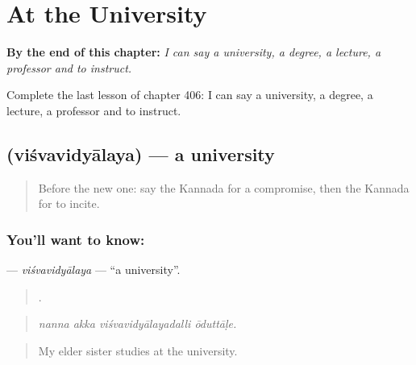 
\chapter{At the University}
\label{ch:ka-at-the-university}

\begin{chapteropening}
\textbf{By the end of this chapter:} \emph{I can say a university, a degree, a lecture, a professor and to instruct.}

Complete the last lesson of chapter 406: I can say a university, a degree, a lecture, a professor and to instruct.
\end{chapteropening}

\section[\texorpdfstring{\kn{ವಿಶ್ವವಿದ್ಯಾಲಯ} (viśvavidyālaya)}{ವಿಶ್ವವಿದ್ಯಾಲಯ (viśvavidyālaya)}]{ (viśvavidyālaya) — a university}

\label{lesson:KA-C406-visvavidyalaya}



\begin{quote}
Before the new one: say the Kannada for a compromise, then the Kannada for to incite.
\end{quote}

\subsection*{You'll want to know: }
\textbf{} — \emph{viśvavidyālaya} — \textquotedblleft{}a university\textquotedblright{}.

\begin{quote}
   .
\end{quote}

\begin{quote}
\emph{nanna akka viśvavidyālayadalli ōduttāḷe.}
\end{quote}

\begin{quote}
My elder sister studies at the university.
\end{quote}

